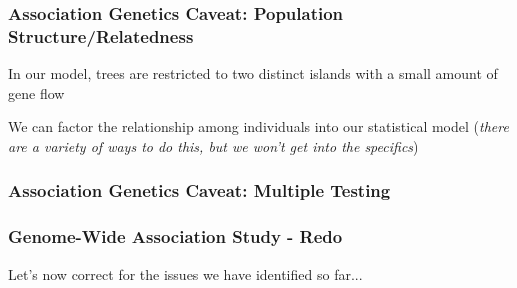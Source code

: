 \documentclass[xcolor=dvipsnames]{beamer}
\begin{document}
\begin{frame}
	
	\frametitle{Association Genetics Caveat: Population Structure/Relatedness}
	
In our model, trees are restricted to two distinct islands with a small amount of gene flow

We can factor the relationship among individuals into our statistical model (\textit{there are a variety of ways to do this, but we won't get into the specifics}) 

\end{frame}



\begin{frame}	
	\frametitle{Association Genetics Caveat: Multiple Testing}
\end{frame}

\begin{frame}
		\frametitle{Genome-Wide Association Study - Redo}

Let's now correct for the issues we have identified so far...

\end{frame}
\end{document}
